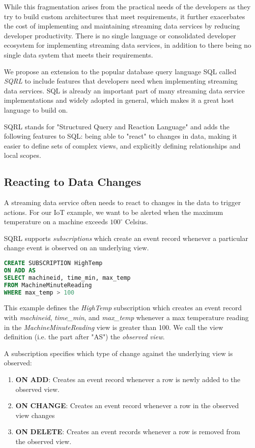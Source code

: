\documentclass[	DIV=calc,%
							paper=letter,%
							fontsize=11pt,%
							twocolumn]{scrartcl}	 					%
\begin{document}
While this fragmentation arises from the practical needs of the developers as they try to build custom architectures that meet requirements, it further exacerbates the cost of implementing and maintaining streaming data services by reducing developer productivity. There is no single language or consolidated developer ecosystem for implementing streaming data services, in addition to there being no single data system that meets their requirements.

We propose an extension to the popular database query language SQL called \emph{SQRL} to include features that developers need when implementing streaming data services. SQL is already an important part of many streaming data service implementations and widely adopted in general, which makes it a great host language to build on.

SQRL stands for "Structured Query and Reaction Language" and adds the following features to SQL: being able to "react" to changes in data, making it easier to define sets of complex views, and explicitly defining relationships and local scopes.

\subsection{Reacting to Data Changes}

A streaming data service often needs to react to changes in the data to trigger actions.
For our IoT example, we want to be alerted when the maximum temperature on a machine exceeds $100^{\circ}$ Celsius.

SQRL supports \emph{subscriptions} which create an event record whenever a particular change event is observed on an underlying view.

\begin{lstlisting}[language=SQL]
CREATE SUBSCRIPTION HighTemp
ON ADD AS
SELECT machineid, time_min, max_temp
FROM MachineMinuteReading
WHERE max_temp > 100
\end{lstlisting}

This example defines the \emph{HighTemp} subscription which creates an event record with \emph{machineid}, \emph{time\_min}, and \emph{max\_temp} whenever a max temperature reading in the \emph{MachineMinuteReading} view is greater than 100. We call the view definition (i.e. the part after "AS") the \emph{observed view}.

A subscription specifies which type of change against the underlying view is observed:
\begin{enumerate}
    \item \textbf{ON ADD}: Creates an event record whenever a row is newly added to the observed view.
    \item \textbf{ON CHANGE}: Creates an event record whenever a row in the observed view changes
    \item \textbf{ON DELETE}: Creates an event records whenever a row is removed from the observed view.
\end{enumerate}
\end{document}
